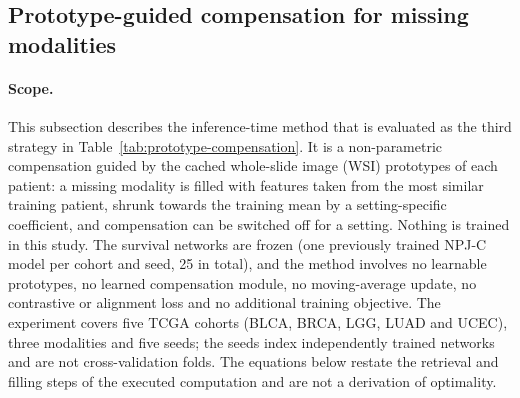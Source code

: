\documentclass[pdflatex,sn-vancouver-num]{sn-jnl}
\begin{document}
\subsection{Prototype-guided compensation for missing modalities}
\label{sec:prototype-compensation}

\paragraph{Scope.}
This subsection describes the inference-time method that is evaluated as the
third strategy in Table~\ref{tab:prototype-compensation}. It is a
non-parametric compensation guided by the cached whole-slide image (WSI)
prototypes of each patient: a missing modality is filled with features taken
from the most similar training patient, shrunk towards the training mean by a
setting-specific coefficient, and compensation can be switched off for a
setting. Nothing is trained in this study. The survival networks are frozen
(one previously trained NPJ-C model per cohort and seed, 25 in total), and the
method involves no learnable prototypes, no learned compensation module, no
moving-average update, no contrastive or alignment loss and no additional
training objective. The experiment covers five TCGA cohorts (BLCA, BRCA, LGG,
LUAD and UCEC), three modalities and five seeds; the seeds index independently
trained networks and are not cross-validation folds. The equations below
restate the retrieval and filling steps of the executed computation and are
not a derivation of optimality.
\end{document}
